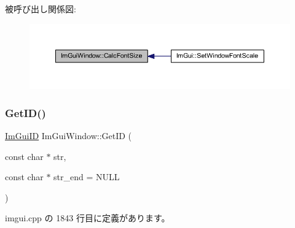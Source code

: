 被呼び出し関係図\+:\nopagebreak
\begin{figure}[H]
\begin{center}
\leavevmode
\includegraphics[width=350pt]{struct_im_gui_window_a6881ed65e208fb6e015d3ae6bccfc794_icgraph}
\end{center}
\end{figure}
\mbox{\label{struct_im_gui_window_a66400a63bc0b54d7d29e08d1b1b1a42b}} 
\subsubsection{\texorpdfstring{Get\+I\+D()}{GetID()}\hspace{0.1cm}{\footnotesize\ttfamily [1/2]}}
{\footnotesize\ttfamily \mbox{\hyperlink{imgui_8h_a1785c9b6f4e16406764a85f32582236f}{Im\+Gui\+ID}} Im\+Gui\+Window\+::\+Get\+ID (\begin{DoxyParamCaption}\item[{const char $\ast$}]{str,  }\item[{const char $\ast$}]{str\+\_\+end = {\ttfamily NULL} }\end{DoxyParamCaption})}



 imgui.\+cpp の 1843 行目に定義があります。

